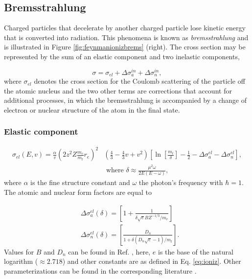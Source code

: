 \subsection{Bremsstrahlung}
Charged particles that decelerate by another charged particle lose kinetic energy that is converted into radiation. This phenomena is known as \textit{bremsstrahlung} and is illustrated in Figure \ref{fig:feynmanionizbrems} (right). The cross section may be represented by the sum of an elastic component and two inelastic components,

\begin{equation}
\sigma = \sigma_{el} + \Delta \sigma^{in}_a + \Delta \sigma^{in}_n,
\end{equation}
where $\sigma_{el}$ denotes the cross section for the Coulomb scattering of the particle off the atomic nucleus and the two other terms are corrections that account for additional processes, in which the bremsstrahlung is accompanied by a change of electron or nuclear structure of the atom in the final state.

\subsubsection{Elastic component}
\begin{equation}
\begin{split}
\sigma_{el} (E,v) = \frac{ \alpha}{v} \left(2 z^2 Z \frac{m_e}{m_t} r_e\right)^2
 &\left(\frac{4}{3} - \frac{4}{3}v +v^2 \right) \left[\ln \left[\frac{m_t}{\delta}\right] - \frac{1}{2} - \Delta \sigma^{el}_a -\Delta \sigma^{el}_ n \right],\\
& \textrm{ \ \ where \ \ } \delta \approx \frac{\mu^2 \omega}{2E(E-\omega)},
\end{split}
\end{equation}
where $\alpha$ is the fine structure constant and $\omega$ the photon's frequency with $\hbar = 1$. The atomic and nuclear form factors are equal to

\begin{equation}
\label{eq:formfactors}
\begin{split}
&\Delta \sigma^{el}_a(\delta) = \left[ 1+ \frac{1}{\delta \sqrt{e} BZ^{-1/3}/m_e}\right] \\
&\Delta \sigma^{el}_n(\delta) = \left[\frac{D_n}{1+\delta (D_n \sqrt{e} -1)/m_t}\right].
\end{split}
\end{equation}
Values for $B$ and $D_n$ can be found in Ref. \cite{Kelner:1995hu}, here, $e$ is the base of the natural logarithm ($\approx 2.718$) and other constants are as defined in Eq. \ref{eq:ioniz}. Other parameterizations can be found in the corresponding literature \cite{Chirkin:2004hz}. 

